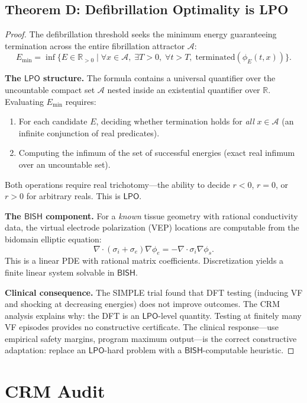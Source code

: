 \documentclass[11pt,a4paper]{article}
\theoremstyle{plain}
\theoremstyle{definition}
\newcommand{\BISH}{\textsf{BISH}}
\newcommand{\LPO}{\textsf{LPO}}
\newcommand{\R}{\mathbb{R}}
\begin{document}
\subsection{Theorem D: Defibrillation Optimality is LPO}

\begin{proof}
The defibrillation threshold seeks the minimum energy guaranteeing termination across the entire fibrillation attractor $\mathcal{A}$:
\[
  E_{\min} = \inf\bigl\{E \in \R_{>0} \mid \forall x \in \mathcal{A},\; \exists T > 0,\; \forall t > T,\; \mathrm{terminated}(\phi_E(t, x))\bigr\}.
\]

\textbf{The $\LPO$ structure.}  The formula contains a universal quantifier over the uncountable compact set $\mathcal{A}$ nested inside an existential quantifier over $\R$.  Evaluating $E_{\min}$ requires:
\begin{enumerate}[nosep]
\item For each candidate $E$, deciding whether termination holds for \emph{all} $x \in \mathcal{A}$ (an infinite conjunction of real predicates).
\item Computing the infimum of the set of successful energies (exact real infimum over an uncountable set).
\end{enumerate}
Both operations require real trichotomy---the ability to decide $r < 0$, $r = 0$, or $r > 0$ for arbitrary reals.  This is $\LPO$.

\textbf{The $\BISH$ component.}  For a \emph{known} tissue geometry with rational conductivity data, the virtual electrode polarization (VEP) locations are computable from the bidomain elliptic equation:
\[
  \nabla \cdot (\sigma_i + \sigma_e)\nabla\phi_e = -\nabla \cdot \sigma_i \nabla\phi_s.
\]
This is a linear PDE with rational matrix coefficients.  Discretization yields a finite linear system solvable in $\BISH$.

\textbf{Clinical consequence.}  The SIMPLE trial \cite{simple2013} found that DFT testing (inducing VF and shocking at decreasing energies) does not improve outcomes.  The CRM analysis explains why: the DFT is an $\LPO$-level quantity.  Testing at finitely many VF episodes provides no constructive certificate.  The clinical response---use empirical safety margins, program maximum output---is the correct constructive adaptation: replace an $\LPO$-hard problem with a $\BISH$-computable heuristic.
\end{proof}

\section{CRM Audit}\label{sec:audit}
\end{document}
